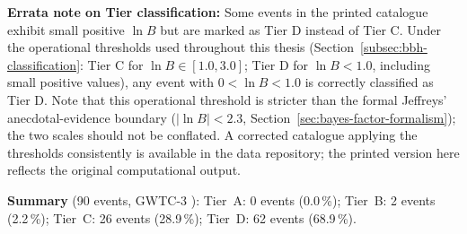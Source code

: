 \documentclass[11pt,a4paper, english]{book}
\theoremstyle{plain}
\theoremstyle{definition}
\numberwithin{equation}{chapter}
\numberwithin{figure}{chapter}
\numberwithin{table}{chapter}
\begin{document}
\noindent\textbf{Errata note on Tier classification:} Some events in
the printed catalogue exhibit small positive $\ln B$ but are marked as
Tier D instead of Tier C. Under the operational thresholds used
throughout this thesis (Section~\ref{subsec:bbh-classification}: Tier C
for $\ln B \in [1.0, 3.0]$; Tier D for $\ln B < 1.0$, including small
positive values), any event with $0 < \ln B < 1.0$ is correctly
classified as Tier D. Note that this operational threshold is stricter
than the formal Jeffreys' anecdotal-evidence boundary
($|\ln B| < 2.3$, Section~\ref{sec:bayes-factor-formalism}); the two
scales should not be conflated. A corrected catalogue applying the
thresholds consistently is available in the data repository; the
printed version here reflects the original computational output.

\noindent\textbf{Summary} (90 events, GWTC-3 \cite{GWTC3_2023}):
Tier~A: 0 events (0.0\,\%);
Tier~B: 2 events (2.2\,\%);
Tier~C: 26 events (28.9\,\%);
Tier~D: 62 events (68.9\,\%).
\end{document}
